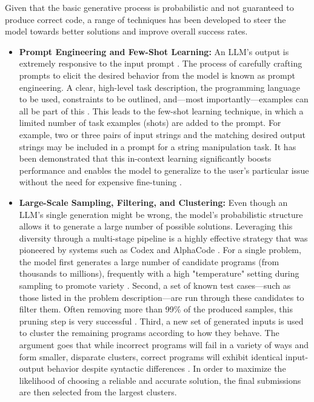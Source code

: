 \documentclass[12pt, a4paper]{report}
\begin{document}
Given that the basic generative process is probabilistic and not guaranteed to produce correct code, a range of techniques has been developed to steer the model towards better solutions and improve overall success rates.

\begin{itemize}
    \item \textbf{Prompt Engineering and Few-Shot Learning:} An LLM's output is extremely responsive to the input prompt \citep{wei2022emergent}. The process of carefully crafting prompts to elicit the desired behavior from the model is known as prompt engineering. A clear, high-level task description, the programming language to be used, constraints to be outlined, and—most importantly—examples can all be part of this \citep{brown2020language}. This leads to the few-shot learning technique, in which a limited number of task examples (shots) are added to the prompt. For example, two or three pairs of input strings and the matching desired output strings may be included in a prompt for a string manipulation task. It has been demonstrated that this in-context learning significantly boosts performance and enables the model to generalize to the user's particular issue without the need for expensive fine-tuning \citep{austin2021multilingual}.
    
    \item \textbf{Large-Scale Sampling, Filtering, and Clustering:} Even though an LLM's single generation might be wrong, the model's probabilistic structure allows it to generate a large number of possible solutions. Leveraging this diversity through a multi-stage pipeline is a highly effective strategy that was pioneered by systems such as Codex and AlphaCode \citep{li2022competition}. For a single problem, the model first generates a large number of candidate programs (from thousands to millions), frequently with a high "temperature" setting during sampling to promote variety \citep{chen2021evaluating}. Second, a set of known test cases—such as those listed in the problem description—are run through these candidates to filter them. Often removing more than 99\% of the produced samples, this pruning step is very successful \citep{li2022competition}. Third, a new set of generated inputs is used to cluster the remaining programs according to how they behave. The argument goes that while incorrect programs will fail in a variety of ways and form smaller, disparate clusters, correct programs will exhibit identical input-output behavior despite syntactic differences \citep{li2022competition}. In order to maximize the likelihood of choosing a reliable and accurate solution, the final submissions are then selected from the largest clusters.
    

\end{itemize}
\end{document}
